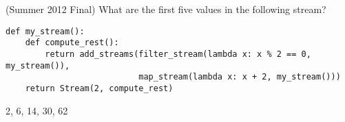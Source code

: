 \question (Summer 2012 Final) What are the first five values in the following
stream?

\begin{lstlisting}
def my_stream():
    def compute_rest():
        return add_streams(filter_stream(lambda x: x % 2 == 0, my_stream()),
                           map_stream(lambda x: x + 2, my_stream()))
    return Stream(2, compute_rest)
\end{lstlisting}
\begin{solution}[1cm]
2, 6, 14, 30, 62
\end{solution}
